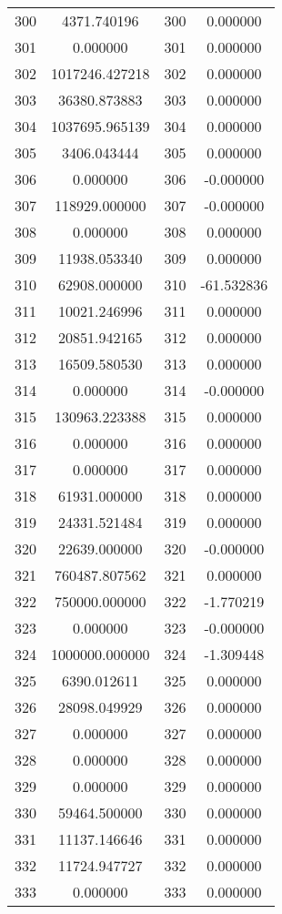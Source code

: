 \documentclass[12pt]{article}
\begin{document}
\begin{longtable}{@{}cccc@{}}
300 & 4371.740196 & 300 & 0.000000 \\
301 & 0.000000 & 301 & 0.000000 \\
302 & 1017246.427218 & 302 & 0.000000 \\
303 & 36380.873883 & 303 & 0.000000 \\
304 & 1037695.965139 & 304 & 0.000000 \\
305 & 3406.043444 & 305 & 0.000000 \\
306 & 0.000000 & 306 & -0.000000 \\
307 & 118929.000000 & 307 & -0.000000 \\
308 & 0.000000 & 308 & 0.000000 \\
309 & 11938.053340 & 309 & 0.000000 \\
310 & 62908.000000 & 310 & -61.532836 \\
311 & 10021.246996 & 311 & 0.000000 \\
312 & 20851.942165 & 312 & 0.000000 \\
313 & 16509.580530 & 313 & 0.000000 \\
314 & 0.000000 & 314 & -0.000000 \\
315 & 130963.223388 & 315 & 0.000000 \\
316 & 0.000000 & 316 & 0.000000 \\
317 & 0.000000 & 317 & 0.000000 \\
318 & 61931.000000 & 318 & 0.000000 \\
319 & 24331.521484 & 319 & 0.000000 \\
320 & 22639.000000 & 320 & -0.000000 \\
321 & 760487.807562 & 321 & 0.000000 \\
322 & 750000.000000 & 322 & -1.770219 \\
323 & 0.000000 & 323 & -0.000000 \\
324 & 1000000.000000 & 324 & -1.309448 \\
325 & 6390.012611 & 325 & 0.000000 \\
326 & 28098.049929 & 326 & 0.000000 \\
327 & 0.000000 & 327 & 0.000000 \\
328 & 0.000000 & 328 & 0.000000 \\
329 & 0.000000 & 329 & 0.000000 \\
330 & 59464.500000 & 330 & 0.000000 \\
331 & 11137.146646 & 331 & 0.000000 \\
332 & 11724.947727 & 332 & 0.000000 \\
333 & 0.000000 & 333 & 0.000000 \\

\end{longtable}
\end{document}
